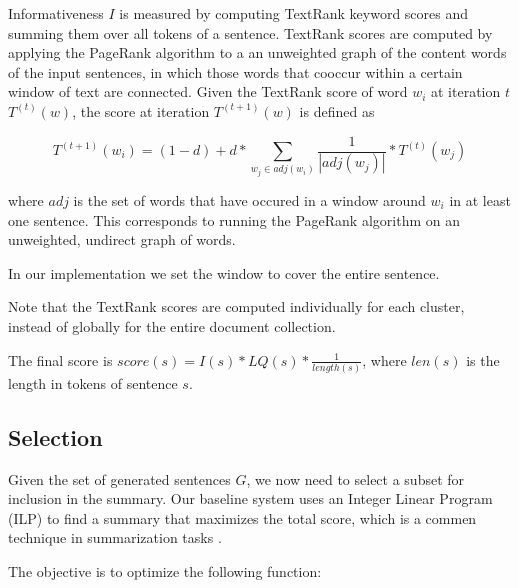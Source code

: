 \documentclass[a4paper,BCOR=10mm]{report}
\numberwithin{lemma}{chapter}
\numberwithin{definition}{chapter}
\begin{document}
Informativeness $I$ is measured by computing TextRank \citet{textrank} keyword scores and summing them over all tokens of a sentence.
TextRank scores are computed by applying the PageRank \citet{pagerank} algorithm to a an unweighted graph of the content words of the input sentences, in which those words that cooccur within a certain window of text are connected.
Given the TextRank score of word $w_i$ at iteration $t$ $T^{(t)}(w)$, the score at iteration $T^{(t + 1)}(w)$ is defined as

\begin{equation}
T^{(t + 1)}(w_i) = (1 - d) + d * \sum_{w_j \in \mathit{adj}(w_i)} \frac{1}{|\mathit{adj}(w_j)|} * T^{(t)}(w_j)
\end{equation}

where $\mathit{adj}$ is the set of words that have occured in a window around $w_i$ in at least one sentence.
This corresponds to running the PageRank algorithm on an unweighted, undirect graph of words.

In our implementation we set the window to cover the entire sentence.

Note that the TextRank scores are computed individually for each cluster, instead of globally for the entire document collection.

The final score is $\mathit{score}(s) = I(s) * LQ(s) * \frac{1}{\mathit{length}(s)}$, where $\mathit{len}(s)$ is the length in tokens of sentence $s$. %


\subsection{Selection} \label{sec:baseline-selection}

Given the set of generated sentences $G$, we now need to select a subset for inclusion in the summary.
Our baseline system uses an Integer Linear Program (ILP) to find a summary that maximizes the total score, which is a commen technique in summarization tasks \citep{survey}.

The objective is to optimize the following function:
\end{document}
